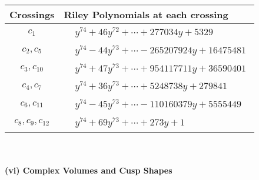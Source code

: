 \documentclass[1p]{elsarticle_modified}
\theoremstyle{definition}
\begin{document}
\begin{tabular}{m{50pt}|m{274pt}}
Crossings & \hspace{64pt}Riley Polynomials at each crossing \\
\hline $$\begin{aligned}c_{1}\end{aligned}$$&$\begin{aligned}
&y^{74}+46 y^{72}+\cdots+277034 y+5329
\end{aligned}$\\
\hline $$\begin{aligned}c_{2},c_{5}\end{aligned}$$&$\begin{aligned}
&y^{74}-44 y^{73}+\cdots-265207924 y+16475481
\end{aligned}$\\
\hline $$\begin{aligned}c_{3},c_{10}\end{aligned}$$&$\begin{aligned}
&y^{74}+47 y^{73}+\cdots+954117711 y+36590401
\end{aligned}$\\
\hline $$\begin{aligned}c_{4},c_{7}\end{aligned}$$&$\begin{aligned}
&y^{74}+36 y^{73}+\cdots+5248738 y+279841
\end{aligned}$\\
\hline $$\begin{aligned}c_{6},c_{11}\end{aligned}$$&$\begin{aligned}
&y^{74}-45 y^{73}+\cdots-110160379 y+5555449
\end{aligned}$\\
\hline $$\begin{aligned}c_{8},c_{9},c_{12}\end{aligned}$$&$\begin{aligned}
&y^{74}+69 y^{73}+\cdots+273 y+1
\end{aligned}$\\
\hline
\end{tabular}\\~\\
\newpage\flushleft \textbf{(vi) Complex Volumes and Cusp Shapes}
\end{document}
